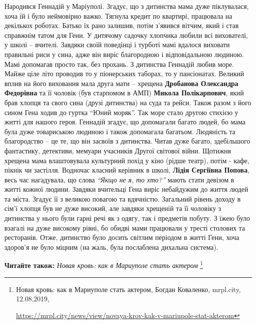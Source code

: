 Народився Геннадій у Маріуполі. Згадує, що з дитинства мама дуже піклувалася,
хоча їй і було неймовірно важко. Тягнула кредит по квартирі, працювала на
декількох роботах. Батько їх рано залишив, потім з'явився вітчим, який і став
справжнім татом для Гени. У дитячому садочку хлопчика любили всі вихователі, у
школі – вчителі. Завдяки своїй поведінці і турботі мамі вдалося виховати
правильні риси у сина, адже він виріс благородною і відповідальною людиною.
Мамі допомагав просто так, без прохань. З дитинства Геннадій любив море. Майже
ціле літо проводив то у піонерських таборах, то у пансіонатах. Великий вплив на
його виховання мала друга мати – хрещена \textbf{Дробанова Олександра Федорівна} та її
чоловік (був старпомом в АМП) \textbf{Микола Полікарпович}, який брав хлопця та свого
сина (друзі дитинства) на суда та рейси. Також разом з його сином Гена ходив до
гуртка \enquote{Юний моряк}. Так море стало другою стихією у житті для нашого героя.
Геннадій згадує, що допомагали багато людей, бо мама була дуже товариською
людиною і також допомагала багатьом. Людяність та благородство – це те, що він
засвоїв з дитинства. Читав дуже багато, здебільшого фантастику, детективи,
мемуари учасників Другої світової війни. Щотижня хрещена мама влаштовувала
культурний похід у кіно (рідше театр), потім - кафе, пікнік чи застілля.
Водночас класний керівник в школі, \textbf{Лідія Сергіївна Попова}, весь час нагадувала,
що слова \emph{\enquote{Якщо не я, то хто?}} мають стати девізом в житті кожної людини.
Завдяки вчительці Гена виріс небайдужим до життя людей та міста. Згадує її з
великою повагою та вдячністю. Загальний рівень доходу в сім'ї хлопця був не
дуже високий, але завдяки хрещеній та її чоловіку з дитинства у нього були
гарні речі як з одягу, так і предметів побуту. З їжею було взагалі на дуже
високому рівні, бо обидві мами працювали у тресті столових та ресторанів. Отже,
дитинство було досить світлим періодом в житті Гени, хоча здоров'я не було
міцним (на жаль, була послаблена дихальна система).

\textbf{Читайте також:} \emph{Новая кровь: как в Мариуполе стать актером}%
\footnote{Новая кровь: как в Мариуполе стать актером, Богдан Коваленко, mrpl.city, 12.08.2019, \par%
\url{https://mrpl.city/news/view/novaya-krov-kak-v-mariupole-stat-akterom}
}


